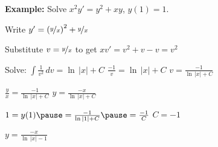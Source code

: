 \documentclass[10pt,aspectratio=169]{beamer}
\begin{document}
\begin{frame}

\textbf{Example:}
Solve 
\quad
$x^2y' = y^2+xy$, \quad $y(1)=1$.

\pause
\medskip

Write $y'= {\left(\nicefrac{y}{x}\right)}^2+\nicefrac{y}{x}$

\medskip
\pause

Substitute \quad $v=\nicefrac{y}{x}$ \quad to get \quad
$xv' = v^2+v-v = v^2$

\medskip
\pause

Solve:
\quad
$\displaystyle
\int \frac{1}{v^2} \,dv = \ln \, \lvert x \rvert + C$
\pause
\wthus
$\displaystyle
\frac{-1}{v} = \ln \, \lvert x \rvert + C$
\pause
\wthus
$\displaystyle
v = \frac{-1}{\ln \, \lvert x \rvert + C}$

\medskip
\pause

\wthus
$\displaystyle
\frac{y}{x} = \frac{-1}{\ln \, \lvert x \rvert + C}$
\pause
\wthus
$\displaystyle
y = \frac{-x}{\ln \, \lvert x \rvert + C}$

\medskip
\pause

$1 = y(1)
\pause
= \frac{-1}{\ln \, \lvert 1 \rvert + C}
\pause
= \frac{-1}{C}$
\pause
\wthus
$C = -1$

\medskip
\pause

\wthus
$\displaystyle
y = \frac{-x}{\ln \, \lvert x \rvert -1}$
\end{frame}
\end{document}
